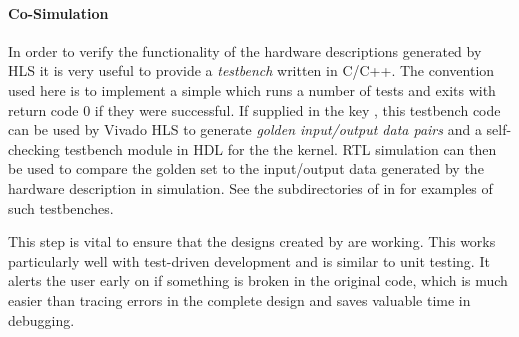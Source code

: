 \paragraph{Co-Simulation}
In order to verify the functionality of the hardware descriptions generated by HLS it is very useful to provide a \emph{testbench} written in C/C++.
The convention used here is to implement a simple  which runs a number of tests and exits with return code 0 if they were successful.
If supplied in the  key , this testbench code can be used by Vivado HLS to generate \emph{golden input/output data pairs} and a self-checking testbench module in HDL for the the kernel.
RTL simulation can then be used to compare the golden set to the input/output data generated by the hardware description in simulation.
See the subdirectories of  in \tapascohome{} for examples of such testbenches.

\medskip
\begin{note}
This step is vital to ensure that the designs created by \tapasco{} are working.
This works particularly well with test-driven development and is similar to unit testing.
It alerts the user early on if something is broken in the original code, which is much easier than tracing errors in the complete design and saves valuable time in debugging.
\end{note}

